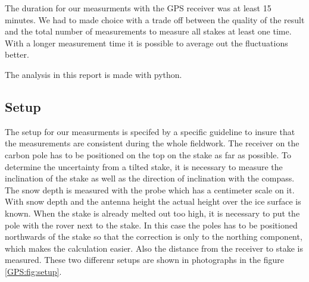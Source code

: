 The duration for our measurments with the GPS receiver was at least 15 minutes. 
We had to made choice with a trade off between the quality of the result and the total number of measurements to measure all stakes at least one time. 
With a longer measurement time it is possible to average out the fluctuations better.
\medskip

The analysis in this report is made with python.

\subsection{Setup} \label{GPS:subsec:setup}

The setup for our measurments is specifed by a specific guideline to insure that the measurements are consistent during the whole fieldwork.
The receiver on the carbon pole has to be positioned on the top on the stake as far as possible. 
To determine the uncertainty from a tilted stake, it is necessary to measure the inclination of the stake as well as the direction of inclination with the compass.
The snow depth is measured with the probe which has a centimeter scale on it.
With snow depth and the antenna height the actual height over the ice surface is known. 
When the stake is already melted out too high, it is necessary to put the pole with the rover next to the stake. 
In this case the poles has to be positioned northwards of the stake so that the correction is only to the northing component, which makes the calculation easier. 
Also the distance from the receiver to stake is measured.
These two differenr setups are shown in photographs in the figure \ref{GPS:fig:setup}.

